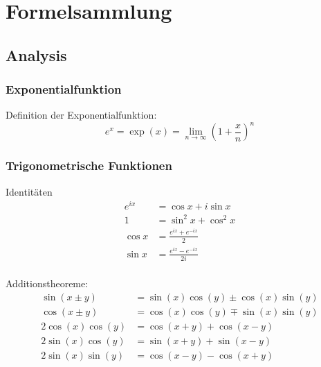 \documentclass[11pt]{article}
\numberwithin{equation}{section}
\begin{document}
  \newpage
	\section{Formelsammlung}
    \subsection{Analysis}
  	  \subsubsection{Exponentialfunktion}

  			Definition der Exponentialfunktion:
  			\begin{equation}
  				e^x=\exp{(x)}=\lim_{n\rightarrow \infty}\left(1+\frac{x}{n}\right)^n
  			\end{equation}

  		\subsubsection{Trigonometrische Funktionen}
  				Identitäten
  				\begin{equation}
  					\begin{split}
  						e^{i x}&=\cos x+i\sin x \\
  						1&=\sin^{2}x+\cos^{2}x \\
  						\cos{x}&=\frac{e^{i x}+e^{-i x}}{2} \\
  						\sin{ x}&=\frac{e^{i x}-e^{-i x}}{2i} \\
  					\end{split}
  				\end{equation}

  				Additionstheoreme:
  				\begin{equation}
  					\begin{split}
  						\sin\left( x\pm y\right)&=\sin\left( x\right)\cos\left( y\right)\pm\cos\left( x\right)\sin\left( y\right) \\
  						\cos\left( x\pm y\right)&=\cos\left( x\right)\cos\left( y\right)\mp\sin\left( x\right)\sin\left( y\right) \\
  						2\cos( x)\cos( y)&=\cos( x+ y)+\cos( x- y) \\
  						2\sin( x)\cos( y)&=\sin( x+ y)+\sin( x- y) \\
  						2\sin( x)\sin( y)&=\cos( x- y)-\cos( x+ y) \\
  					\end{split}
  				\end{equation}
\end{document}
